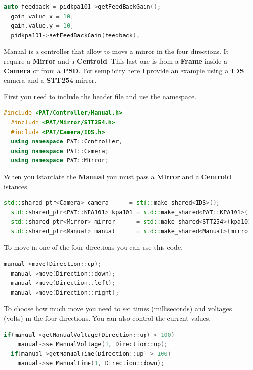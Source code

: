 \begin{lstlisting}[language=c++, gobble=2]
  auto feedback = pidkpa101->getFeedBackGain();
  gain.value.x = 10;
  gain.value.y = 10;
  pidkpa101->setFeedBackGain(feedback);
\end{lstlisting}



Manual is a controller that allow to move a mirror in the four
directions. It require a \textbf{Mirror} and a \textbf{Centroid}. This
last one is from a \textbf{Frame} inside a \textbf{Camera} or from a
\textbf{PSD}. For semplicity here I provide an example using a
\textbf{IDS} camera and a \textbf{STT254} mirror.

First you need to include the header file and use the namespace.

\begin{lstlisting}[language=c++, gobble=2]
  #include <PAT/Controller/Manual.h>
  #include <PAT/Mirror/STT254.h>
  #include <PAT/Camera/IDS.h>
  using namespace PAT::Controller;
  using namespace PAT::Camera;
  using namespace PAT::Mirror;
\end{lstlisting}


When you istantiate the \textbf{Manual} you must pass a \textbf{Mirror}
and a \textbf{Centroid} istances.

\begin{lstlisting}[language=c++, gobble=2]
  std::shared_ptr<Camera> camera      = std::make_shared<IDS>();
  std::shared_ptr<PAT::KPA101> kpa101 = std::make_shared<PAT::KPA101>();
  std::shared_ptr<Mirror> mirror      = std::make_shared<STT254>(kpa101);
  std::shared_ptr<Manual> manual      = std::make_shared<Manual>(mirror, camera->getFrame()->getCentroid());
\end{lstlisting}


To move in one of the four directions you can use this code.

\begin{lstlisting}[language=c++, gobble=2]
  manual->move(Direction::up);
  manual->move(Direction::down);
  manual->move(Direction::left);
  manual->move(Direction::right);
\end{lstlisting}


To choose how much move you need to set times (milliseconds) and
voltages (volts) in the four directions. You can also control the
current values.

\begin{lstlisting}[language=c++, gobble=2]
  if(manual->getManualVoltage(Direction::up) > 100)
    manual->setManualVoltage(1, Direction::up);
  if(manual->getManualTime(Direction::up) > 100)
    manual->setManualTime(1, Direction::down);
\end{lstlisting}


